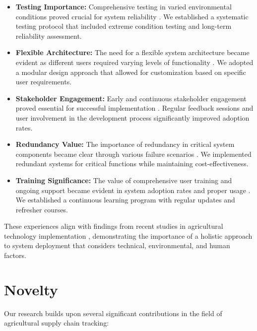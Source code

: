 \documentclass[conference]{IEEEtran}
\begin{document}
\begin{itemize}
    \item \textbf{Testing Importance:} Comprehensive testing in varied environmental conditions proved crucial for system reliability \cite{visconti2020development}. We established a systematic testing protocol that included extreme condition testing and long-term reliability assessment.
    
    \item \textbf{Flexible Architecture:} The need for a flexible system architecture became evident as different users required varying levels of functionality \cite{xu2023novel}. We adopted a modular design approach that allowed for customization based on specific user requirements.
    
    \item \textbf{Stakeholder Engagement:} Early and continuous stakeholder engagement proved essential for successful implementation \cite{tharatipyakul2021user}. Regular feedback sessions and user involvement in the development process significantly improved adoption rates.
    
    \item \textbf{Redundancy Value:} The importance of redundancy in critical system components became clear through various failure scenarios \cite{rosero2023smart}. We implemented redundant systems for critical functions while maintaining cost-effectiveness.
    
    \item \textbf{Training Significance:} The value of comprehensive user training and ongoing support became evident in system adoption rates and proper usage \cite{elbeheiry2023technologies}. We established a continuous learning program with regular updates and refresher courses.
\end{itemize}

These experiences align with findings from recent studies in agricultural technology implementation \cite{ahmed2024optimized}, demonstrating the importance of a holistic approach to system deployment that considers technical, environmental, and human factors.

\section{Novelty}
Our research builds upon several significant contributions in the field of agricultural supply chain tracking:
\end{document}

